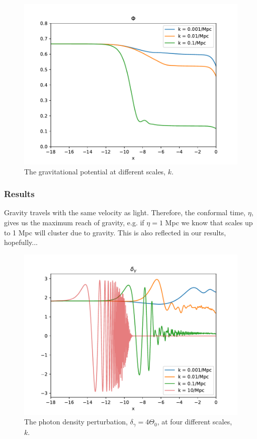 \documentclass{aa}
\begin{document}
\begin{figure}[h!]
   \includegraphics[scale=0.6]{../figures/milestone3/test_phi.pdf}
   \caption{The gravitational potential at different scales, $k$.}\label{fig:test5}
\end{figure}

\subsubsection{Results}
Gravity travels with the same velocity as light. Therefore, the conformal time, $\eta$, gives us the maximum reach of gravity, e.g. if $\eta= 1$ Mpc we know that 
scales up to 1 Mpc will cluster due to gravity. This is also reflected in our results, hopefully...  

\begin{figure}[h!]
   \includegraphics[scale=0.6]{../figures/milestone3/delta_gamma.pdf}
   \caption{The photon density perturbation, $\delta_\gamma = 4\Theta_0$, at four different scales, $k$. }\label{fig:delta_gamma}
\end{figure}
\end{document}
